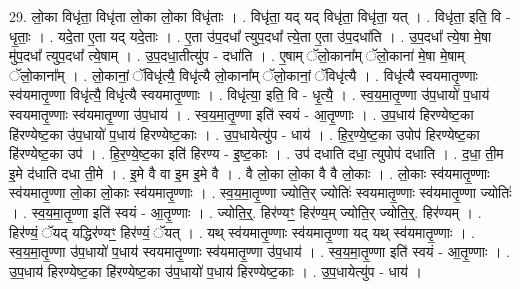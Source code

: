 \documentclass[17pt]{extarticle}
\begin{document}
29. लो॒का विधृ॑ता॒ विधृ॑ता लो॒का लो॒का विधृ॑ताः । . विधृ॑ता॒ यद् यद् विधृ॑ता॒ विधृ॑ता॒ यत् । . विधृ॑ता॒ इति॒ वि - धृ॒ताः॒ । . यदे॒ता ए॒ता यद् यदे॒ताः । . ए॒ता उ॑प॒दधा᳚ त्युप॒दधा᳚ त्ये॒ता ए॒ता उ॑प॒दधा॑ति । . उ॒प॒दधा᳚ त्ये॒षा मे॒षा मु॑प॒दधा᳚ त्युप॒दधा᳚ त्ये॒षाम् । . उ॒प॒दधा॒तीत्यु॑प - दधा॑ति । . ए॒षाम् ॅलो॒काना᳚म् ॅलो॒काना॑ मे॒षा मे॒षाम् ॅलो॒काना᳚म् । . लो॒कानां॒ ॅविधृ॑त्यै॒ विधृ॑त्यै लो॒काना᳚म् ॅलो॒कानां॒ ॅविधृ॑त्यै । . विधृ॑त्यै स्वयमातृ॒ण्णाः स्व॑यमातृ॒ण्णा विधृ॑त्यै॒ विधृ॑त्यै स्वयमातृ॒ण्णाः । . विधृ॑त्या॒ इति॒ वि - धृ॒त्यै॒ । . स्व॒य॒मा॒तृ॒ण्णा उ॑प॒धायो॑ प॒धाय॑ स्वयमातृ॒ण्णाः स्व॑यमातृ॒ण्णा उ॑प॒धाय॑ । . स्व॒य॒मा॒तृ॒ण्णा इति॑ स्वयं - आ॒तृ॒ण्णाः । . उ॒प॒धाय॑ हिरण्येष्ट॒का हि॑रण्येष्ट॒का उ॑प॒धायो॑ प॒धाय॑ हिरण्येष्ट॒काः । . उ॒प॒धायेत्यु॑प - धाय॑ । . हि॒र॒ण्ये॒ष्ट॒का उपोप॑ हिरण्येष्ट॒का हि॑रण्येष्ट॒का उप॑ । . हि॒र॒ण्ये॒ष्ट॒का इति॑ हिरण्य - इ॒ष्ट॒काः । . उप॑ दधाति दधा॒ त्युपोप॑ दधाति । . द॒धा॒ ती॒म इ॒मे द॑धाति दधा ती॒मे । . इ॒मे वै वा इ॒म इ॒मे वै । . वै लो॒का लो॒का वै वै लो॒काः । . लो॒काः स्व॑यमातृ॒ण्णाः स्व॑यमातृ॒ण्णा लो॒का लो॒काः स्व॑यमातृ॒ण्णाः । . स्व॒य॒मा॒तृ॒ण्णा ज्योति॒र् ज्योतिः॑ स्वयमातृ॒ण्णाः स्व॑यमातृ॒ण्णा ज्योतिः॑ । . स्व॒य॒मा॒तृ॒ण्णा इति॑ स्वयं - आ॒तृ॒ण्णाः । . ज्योति॒र्॒. हिर॑ण्यꣳ॒॒ हिर॑ण्य॒म् ज्योति॒र् ज्योति॒र्॒. हिर॑ण्यम् । . हिर॑ण्यं॒ ॅयद् यद्धिर॑ण्यꣳ॒॒ हिर॑ण्यं॒ ॅयत् । . यथ् स्व॑यमातृ॒ण्णाः स्व॑यमातृ॒ण्णा यद् यथ् स्व॑यमातृ॒ण्णाः । . स्व॒य॒मा॒तृ॒ण्णा उ॑प॒धायो॑ प॒धाय॑ स्वयमातृ॒ण्णाः स्व॑यमातृ॒ण्णा उ॑प॒धाय॑ । . स्व॒य॒मा॒तृ॒ण्णा इति॑ स्वयं - आ॒तृ॒ण्णाः । . उ॒प॒धाय॑ हिरण्येष्ट॒का हि॑रण्येष्ट॒का उ॑प॒धायो॑ प॒धाय॑ हिरण्येष्ट॒काः । . उ॒प॒धायेत्यु॑प - धाय॑ । \newline
\end{document}
